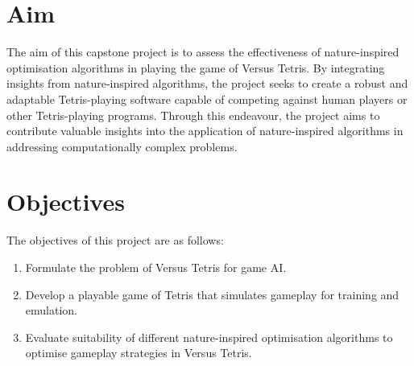 \documentclass[a4paper, 12pt]{extreport}
\begin{document}
	\section{Aim}
	
	
	The aim of this capstone project is to assess the effectiveness of nature-inspired optimisation algorithms in playing the game of Versus Tetris. By integrating insights from nature-inspired algorithms, the project seeks to create a robust and adaptable Tetris-playing software capable of competing against human players or other Tetris-playing programs. Through this endeavour, the project aims to contribute valuable insights into the application of nature-inspired algorithms in addressing computationally complex problems.
	
	\section{Objectives}
	
	
	The objectives of this project are as follows:
	
	\begin{enumerate}
		\item Formulate the problem of Versus Tetris for game AI.
		\item Develop a playable game of Tetris that simulates gameplay for training and emulation.
		\item Evaluate suitability of different nature-inspired optimisation algorithms to optimise gameplay strategies in Versus Tetris.
	\end{enumerate}
	
\end{document}
